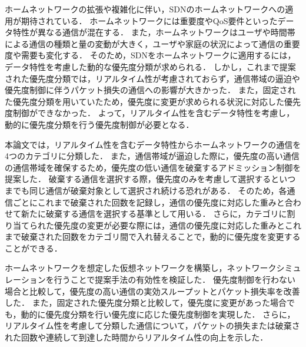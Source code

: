 \documentclass[a4paper,11pt,uplatex]{ujreport}
\begin{document}
  ホームネットワークの拡張や複雑化に伴い，SDNのホームネットワークへの適用が期待されている．
  ホームネットワークには重要度やQoS要件といったデータ特性が異なる通信が混在する．
  また，ホームネットワークはユーザや時間帯による通信の種類と量の変動が大きく，ユーザや家庭の状況によって通信の重要度や需要も変化する．
  そのため，SDNをホームネットワークに適用するには，データ特性を考慮した動的な優先度分類が求められる．
  しかし，これまで提案された優先度分類では，リアルタイム性が考慮されておらず，通信帯域の逼迫や優先度制御に伴うパケット損失の通信への影響が大きかった．
  また，固定された優先度分類を用いていたため，優先度に変更が求められる状況に対応した優先度制御ができなかった．
  よって，リアルタイム性を含むデータ特性を考慮し，動的に優先度分類を行う優先度制御が必要となる．\par
  本論文では，リアルタイム性を含むデータ特性からホームネットワークの通信を4つのカテゴリに分類した．
  また，通信帯域が逼迫した際に，優先度の高い通信の通信帯域を確保するため，優先度の低い通信を破棄するアドミッション制御を提案した．
  破棄する通信を選択する際，優先度のみを考慮して選択するといつまでも同じ通信が破棄対象として選択され続ける恐れがある．
  そのため，各通信ごとにこれまで破棄された回数を記録し，通信の優先度に対応した重みと合わせて新たに破棄する通信を選択する基準として用いる．
  さらに，カテゴリに割り当てられた優先度の変更が必要な際には，通信の優先度に対応した重みとこれまで破棄された回数をカテゴリ間で入れ替えることで，動的に優先度を変更することができる．\par
  ホームネットワークを想定した仮想ネットワークを構築し，ネットワークシミュレーションを行うことで提案手法の有効性を検証した．
  優先度制御を行わない場合と比較して，優先度の高い通信の実効スループットとパケット損失率を改善した．
  また，固定された優先度分類と比較して，優先度に変更があった場合でも，動的に優先度分類を行い優先度に応じた優先度制御を実現した．
  さらに，リアルタイム性を考慮して分類した通信について，パケットの損失または破棄された回数や連続して到達した時間からリアルタイム性の向上を示した．

\end{document}
